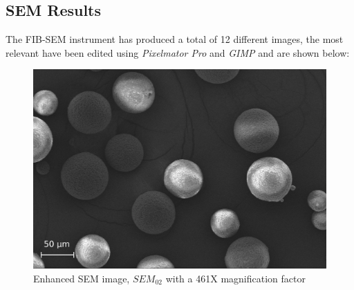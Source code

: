 \documentclass{article}
\begin{document}
      \subsection{SEM Results\label{SEM_analysis_results}}

                
      The FIB-SEM instrument has produced a total of 12 different images, the most relevant have been edited using 
      \textit{Pixelmator Pro} and \textit{GIMP} \autocites{Pixelmator_Pro}{GIMP} and are shown below: \\


          \begin{figure}[h!]
              \centering 
              \includegraphics[width=\textwidth]{Pictures/SEM/Edited/04_02.eps}
              \caption{Enhanced SEM image, $SEM_{02}$ with a 461X magnification factor}
              \label{fig:SEM_02}
          \end{figure}
\end{document}
